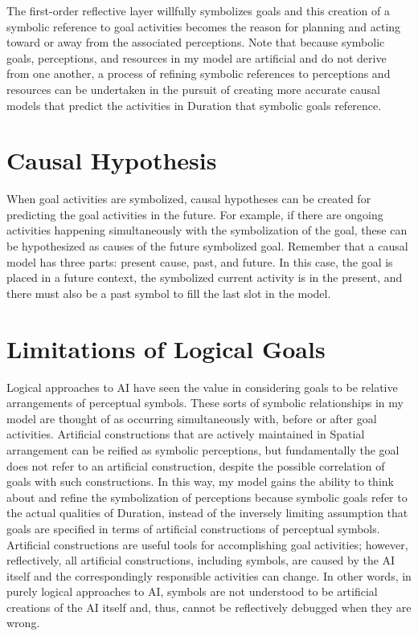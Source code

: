 The first-order reflective layer willfully symbolizes goals and this
creation of a symbolic reference to goal activities becomes the reason
for planning and acting toward or away from the associated
perceptions.  Note that because symbolic goals, perceptions, and
resources in my model are artificial and do not derive from one
another, a process of refining symbolic references to perceptions and
resources can be undertaken in the pursuit of creating more accurate
causal models that predict the activities in Duration that symbolic
goals reference.

\section{Causal Hypothesis}

When goal activities are symbolized, causal hypotheses can be created
for predicting the goal activities in the future.  For example, if
there are ongoing activities happening simultaneously with the
symbolization of the goal, these can be hypothesized as causes of the
future symbolized goal.  Remember that a causal model has three parts:
present cause, past, and future.  In this case, the goal is placed in
a future context, the symbolized current activity is in the present,
and there must also be a past symbol to fill the last slot in the
model.

\section{Limitations of Logical Goals}

Logical approaches to AI have seen the value in considering goals to
be relative arrangements of perceptual symbols.  These sorts of
symbolic relationships in my model are thought of as occurring
simultaneously with, before or after goal activities.  Artificial
constructions that are actively maintained in Spatial arrangement can
be reified as symbolic perceptions, but fundamentally the goal does
not refer to an artificial construction, despite the possible
correlation of goals with such constructions.  In this way, my model
gains the ability to think about and refine the symbolization of
perceptions because symbolic goals refer to the actual qualities of
Duration, instead of the inversely limiting assumption that goals are
specified in terms of artificial constructions of perceptual symbols.
Artificial constructions are useful tools for accomplishing goal
activities; however, reflectively, all artificial constructions,
including symbols, are caused by the AI itself and the correspondingly
responsible activities can change.  In other words, in purely logical
approaches to AI, symbols are not understood to be artificial
creations of the AI itself and, thus, cannot be reflectively debugged
when they are wrong.

